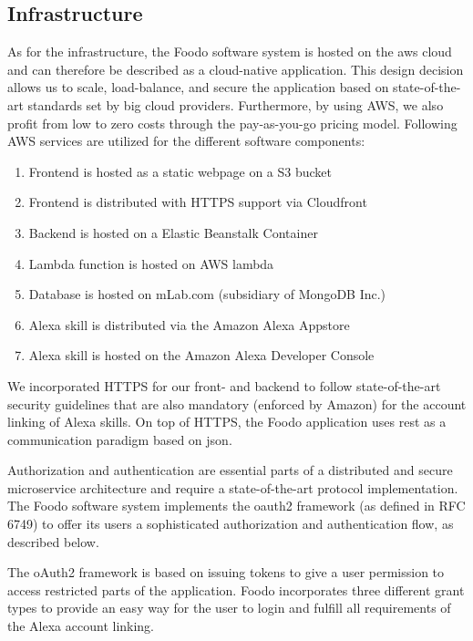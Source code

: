\subsection{Infrastructure}
As for the infrastructure, the Foodo software system is hosted on the \gls{aws} cloud and can therefore be described as a cloud-native application. This design decision allows us to scale, load-balance, and secure the application based on state-of-the-art standards set by big cloud providers. Furthermore, by using AWS, we also profit from low to zero costs through the pay-as-you-go pricing model. Following AWS services are utilized for the different software components:

\begin{enumerate}
	\itemsep-0.5em 
	\item Frontend is hosted as a static webpage on a S3 bucket
	\item Frontend is distributed with HTTPS support via Cloudfront
	\item Backend is hosted on a Elastic Beanstalk Container
	\item Lambda function is hosted on AWS lambda
	\item Database is hosted on mLab.com (subsidiary of MongoDB Inc.)
	\item Alexa skill is distributed via the Amazon Alexa Appstore 
	\item Alexa skill is hosted on the Amazon Alexa Developer Console
\end{enumerate}


We incorporated HTTPS for our front- and backend to follow state-of-the-art security guidelines that are also mandatory (enforced by Amazon) for the account linking of Alexa skills. On top of HTTPS, the Foodo application uses \gls{rest} as a communication paradigm based on \gls{json}.

Authorization and authentication are essential parts of a distributed and secure microservice architecture and require a state-of-the-art protocol implementation. The Foodo software system implements the \gls{oauth2} framework (as defined in RFC 6749) to offer its users a sophisticated authorization and authentication flow, as described below.  


The oAuth2 framework is based on issuing tokens to give a user permission to access restricted parts of the application. Foodo incorporates three different grant types to provide an easy way for the user to login and fulfill all requirements of the Alexa account linking. 


